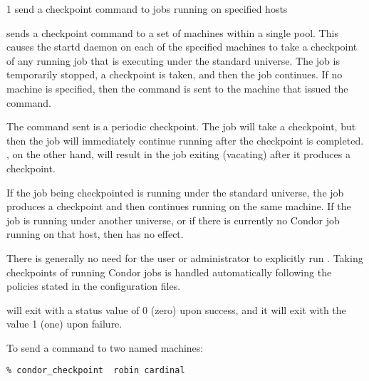 \begin{ManPage}{\label{man-condor-checkpoint}}{1}
{send a checkpoint command to jobs running on specified hosts}
\Synopsis {}
\ToolArgsBase

\ToolDebugOption
\ToolArgsLocate

\ToolDebugOption
\ToolWhere


\Description
{} sends a checkpoint command to a set
of machines within a single pool.
This causes the startd daemon on each of the specified machines
to take a checkpoint of any running job that is executing under
the standard universe.
The job is temporarily stopped, a checkpoint is taken,
and then the job continues.
If no machine is specified, then the command
is sent to the machine that issued the
 command.

The command sent is a periodic checkpoint.
The job will take a checkpoint, but then the job will immediately
continue running after the checkpoint is completed.
, on the other hand, will result in the job exiting
(vacating) after it produces a checkpoint. 

If the job being checkpointed is running under the standard universe,
the job produces a checkpoint and then continues running
on the same machine.
If the job is running under another universe,
or if there is currently no Condor job
running on that host, then  has no effect. 

There is generally no need for the user or administrator to explicitly
run .
Taking checkpoints of running Condor jobs is
handled automatically following the policies
stated in the configuration files. 

\begin{Options}
	\ToolArgsBaseDesc
	\ToolDebugDesc
	\ToolArgsLocateDesc
\end{Options}

\ExitStatus

 will exit with a status value of 0 (zero) upon success,
and it will exit with the value 1 (one) upon failure.

\Examples
To send a  command to two named machines:
\begin{verbatim}
% condor_checkpoint  robin cardinal
\end{verbatim}


\end{ManPage}
